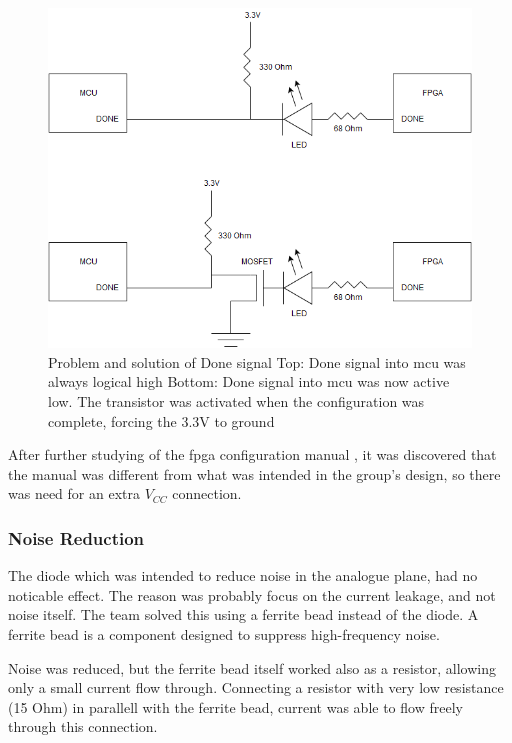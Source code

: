 \begin{figure}[h!]
\centering
\includegraphics[scale=0.5]{images/Done_Signal_Issue.png}
\caption{Problem and solution of Done signal
         \newline
         Top: Done signal into \gls{mcu} was always logical high
         \newline
         Bottom: Done signal into \gls{mcu} was now active low. The transistor was activated when the configuration was complete, forcing the 3.3V to ground}
\label{fig:Done Issue}
\end{figure}

After further studying of the \gls{fpga} configuration manual \cite[page 42]{fpga-configuration},
it was discovered that the manual was different from what was intended in the group's design,
so there was need for an extra \(V_{CC}\) connection.

\subsubsection{Noise Reduction}
The diode which was intended to reduce noise in the analogue plane, had no noticable effect.
The reason was probably focus on the current leakage, and not noise itself.
The team solved this using a ferrite bead instead of the diode.
A ferrite bead is a component designed to suppress high-frequency noise.

Noise was reduced, but the ferrite bead itself worked also as a resistor, allowing only a small current flow through.
Connecting a resistor with very low resistance (15 Ohm) in parallell with the ferrite bead, current was able to flow freely through this connection.

